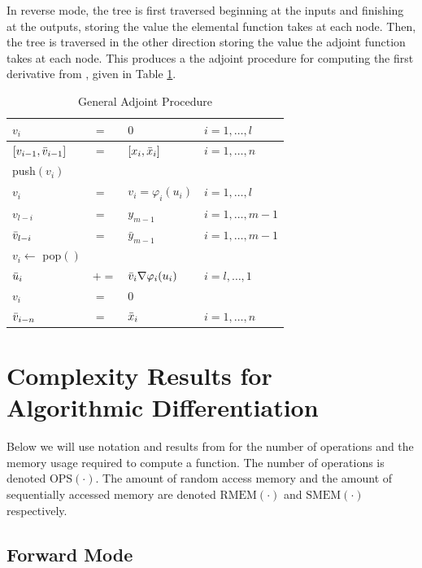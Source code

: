 \documentclass{article}
\begin{document}
In reverse mode, the tree is first traversed beginning at the inputs and finishing at the outputs, storing the value the elemental function takes at each node. Then, the tree is traversed in the other direction storing the value the adjoint function takes at each node. This produces a the adjoint procedure for computing the first derivative from \cite{dhamarticle}, given in Table \ref{tab:ap}.

\begin{table}[h]
    \centering
    \begin{tabular}{|llll|}
        \hline
        $v_{i}$ & $=$ & $0$ & $i = 1, \ldots, l$ \\
        \hline
        $[v_{i-1}, \Bar{v}_{i-1}]$ & $=$ & $[x_{i}, \Bar{x}_{i}]$ & $i = 1, \ldots, n$ \\
        \hline
        push$(v_i)$ & & & \\
        $v_{i}$ & $=$ & $v_i = \varphi_i (u_i)$ & $i = 1, \ldots, l$ \\
        \hline
        $v_{l-i}$ & $=$ & $y_{m-1}$ & $i = 1, \ldots, m-1$ \\
        $\Bar{v}_{l-i}$ & $=$ & $\bar{y}_{m-1}$ & $i = 1, \ldots, m-1$ \\
        \hline
        $v_i \leftarrow$ pop$()$ & & & \\
        $\Bar{u}_i$ & $+=$ & $\Bar{v}_i \nabla \varphi_i (u_i)$ & $i = l, \ldots, 1$ \\
        $v_i$ & $=$ & $0$ & \\
        \hline
        $\Bar{v}_{i-n}$ & $=$ & $\Bar{x}_i$ & $i = 1, \ldots, n$ \\
        \hline
    \end{tabular}
    \caption{General Adjoint Procedure}
    \label{tab:ap}
\end{table}

\section{Complexity Results for Algorithmic Differentiation}

Below we will use notation and results from \cite{dhamarticle} for the number of operations and the memory usage required to compute a function. The number of operations is denoted $\text{OPS}(\cdot)$. The amount of random access memory and the amount of sequentially accessed memory are denoted $\text{RMEM}(\cdot)$ and $\text{SMEM}(\cdot)$ respectively. 

\subsection{Forward Mode}
\end{document}
